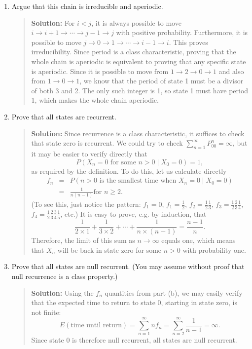 \documentclass{article}
\begin{document}
\begin{enumerate}
  \begin{enumerate}
  
  \item Argue that this chain is irreducible and aperiodic.
  \begin{quotation}{\bf Solution:}
  For $i<j$, it is always possible to move $i\to i+1 \to \cdots \to j-1 \to j$ 
  with positive probability.  Furthermore, it is possible to move $j\to 0 \to 1 \to \cdots \to i-1 \to i$.
  This proves irreducibility.  Since period is a class characteristic, proving that the whole chain
  is aperiodic is equivalent to proving that any specific state is aperiodic.  Since it is possible 
  to move from $1\to 2 \to 0 \to 1$ and also from $1\to 0 \to 1$, we know that the period of 
  state 1 must be a divisor of both 3 and 2.  The only such integer is 1, so state 1 must have
  period 1, which makes the whole chain aperiodic.
  \end{quotation}

  \item Prove that all states are recurrent.
  \begin{quotation}{\bf Solution:}
  Since recurrence is a class characteristic,
  it suffices to check that state zero is recurrent.  We could try to check
  $\sum_{n=1}^\infty P_{00}^n=\infty$, but it may be easier to verify directly that 
  \[
  P(\mbox{$X_n=0$ for some $n>0$} \mid X_0=0) = 1,
  \]
  as required by the definition.  To do this, let us calculate directly
  \begin{eqnarray*}
  f_n &=&  P(\mbox{$n>0$ is the smallest time when $X_n=0$}  \mid X_0=0) \\
  &=& \frac{1}{n(n-1)} \mbox{for $n\ge2$}.
  \end{eqnarray*}
  (To see this, just notice the pattern:  $f_1=0$, $f_1=\frac12$,
  $f_2=\frac12 \frac13$, $f_3=\frac12\frac23 \frac14$, $f_4=\frac12 \frac23 \frac34 \frac15$, etc.)
  It is easy to prove, e.g. by induction, that
  \[
  \frac{1}{2\times 1} +   \frac{1}{3\times 2} +   \cdots +   \frac{1}{n\times (n-1)} = \frac{n-1}{n}.
  \]
  Therefore, the limit of this sum as $n\to\infty$ equals one, which means that $X_n$ will be
  back in state zero for some $n>0$ with probability one.
  \end{quotation}

  \item Prove that all states are null recurrent. (You may assume without proof
  that null recurrence is a class property.)
  \begin{quotation}{\bf Solution:}
  Using the $f_n$ quantities from part (b), we may easily verify that the expected time to return to state 0, starting
  in state zero, is not finite:
  \[
  E(\mbox{time until return}) = \sum_{n=1}^\infty nf_n = \sum_{n=2}^\infty \frac{1}{n-1} = \infty.
  \]
  Since state 0 is therefore null recurrent, all states are null recurrent.
  \end{quotation}


\end{enumerate}
\end{enumerate}
\end{document}
